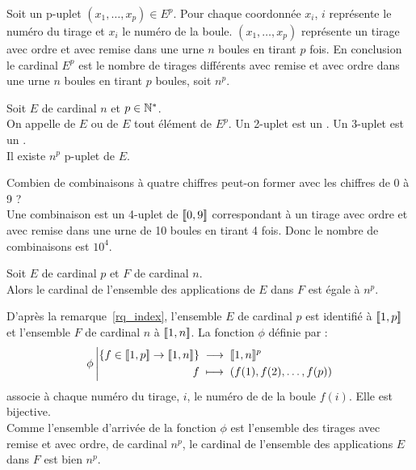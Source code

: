 \documentclass{book}
\begin{document}
\begin{Demonstration} Soit un p-uplet $(x_1,\dots,x_p)\in E^p$. Pour chaque coordonnée $x_i$, $i$ représente le numéro du tirage et $x_i$ le numéro de la boule. $(x_1,\dots,x_p)$ représente un tirage avec ordre et avec remise dans une urne $n$ boules en tirant $p$ fois. 
En conclusion le cardinal $E^p$ est le nombre  de tirages différents avec remise et avec ordre dans une urne $n$ boules en tirant $p$ boules, soit  $n^p$.
\end{Demonstration}
\begin{DefinitionProposition}[p-uplet] Soit $E$  de cardinal $n$ et $p\in\mathbb{N}^*$.\\
On appelle  de $E$ ou  de $E$ tout élément de $E^p$. Un 2-uplet est un .  Un 3-uplet est un .\\ 
Il existe $n^p$ p-uplet de $E$.
\end{DefinitionProposition}
\begin{Exemple} Combien de combinaisons à quatre chiffres peut-on former avec les chiffres de 0 à 9 ?\\
Une combinaison est un 4-uplet de $\mathopen\lbrack\!\lbrack0,9 \mathclose\rbrack\!\rbrack$ correspondant à un tirage avec ordre et avec remise  dans une urne de 10 boules en tirant 4 fois.   Donc le nombre de combinaisons est $10^4$.
\end{Exemple}
\begin{Corollaire}\label{diff}Soit $E$  de cardinal $p$ et $F$ de cardinal $n$.\\ Alors le cardinal de l'ensemble 
des applications de $E$ dans $F$ est égale à  $n^p$.
\end{Corollaire}
\begin{Demonstration} D'après la remarque~\ref{rq_index}, l'ensemble $E$  de cardinal $p$ est identifié à $\mathopen\lbrack\!\lbrack1,p \mathclose\rbrack\!\rbrack$ et l'ensemble $F$ de cardinal $n$ à $\mathopen\lbrack\!\lbrack1,n \mathclose\rbrack\!\rbrack$.  La fonction $\phi$ définie par :
\[
{\phi}\left|\begin{aligned}{\left\{ f\in\mathopen\lbrack\!\lbrack1,p \mathclose\rbrack\!\rbrack\to \mathopen\lbrack\!\lbrack1,n \mathclose\rbrack\!\rbrack\right\} }&\;\longrightarrow\;{ \mathopen\lbrack\!\lbrack1,n \mathclose\rbrack\!\rbrack^p}\\{f}&\;\longmapsto\;{\left (f(1),f(2),\dots, f(p)\right )}\end{aligned}\right.
\]
associe à chaque  numéro du tirage, $i$, le numéro de  de la boule $f(i)$. Elle est bijective.\\
Comme l'ensemble d'arrivée de la fonction $\phi$ est l'ensemble des tirages avec remise et avec ordre, de cardinal $n^p$, le cardinal de l'ensemble des applications $E$ dans $F$ est bien $n^p$.
\end{Demonstration}
\end{document}
